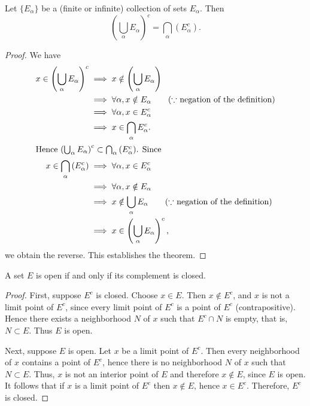  \begin{theorem}\label{thm:De_Morgan}
Let $\{E_{\alpha}\}$ be a (finite or infinite) collection of sets $E_{\alpha}$. 
Then
\begin{equation}
    \left(\bigcup_{\alpha}E_{\alpha}\right)^c = \bigcap_{\alpha} \left(E_{\alpha}^c\right).
\end{equation}
 \end{theorem}
 \begin{proof}
We have
\begin{align*}
x \in \left(\bigcup_{\alpha}E_{\alpha}\right)^c &\implies x \notin \left(\bigcup_{\alpha}E_{\alpha}\right) \\ 
&\implies \forall \alpha, x \notin E_{\alpha} \tag*{($\because$ negation of the definition)} \\
&\implies \forall \alpha, x \in E_{\alpha}^c \\
&\implies x\in \bigcap_{\alpha} E_{\alpha}^c. \\
\intertext{Hence $\left(\bigcup_{\alpha}E_{\alpha}\right)^c \subset \bigcap_{\alpha} \left(E_{\alpha}^c\right)$.
Since}
    x \in \bigcap_{\alpha} \left(E_{\alpha}^c\right) &\implies \forall \alpha, x \in E_{\alpha}^c \\
    &\implies \forall \alpha, x \notin E_{\alpha} \\
    &\implies x \notin \bigcup_{\alpha} E_{\alpha} \tag*{($\because$ negation of the definition)} \\
    &\implies x \in \left(\bigcup_{\alpha}E_{\alpha}\right)^c,
\end{align*}
we obtain the reverse. This establishes the theorem.
 \end{proof}
 \begin{theorem}\label{thm:open_close_equivalnce}
    A set $E$ is open if and only if its complement is closed.
 \end{theorem}
 \begin{proof}
First, suppose $E^c$ is closed. Choose $x \in E$. 
Then $x \notin E^c$, and $x$ is not a limit point of $E^c$, since every limit point of $E^c$ is a point of $E^c$ (contrapositive).
Hence there exists a neighborhood $N$ of $x$ such that $E^c \cap N$ is empty, that is, $N \subset E$.
Thus $E$ is open.

Next, suppose $E$ is open. 
Let $x$ be a limit point of $E^c$.
Then every neighborhood of $x$ contains a point of $E^c$, hence there is no neighborhood $N$ of $x$ such that $N \subset E$.
Thus, $x$ is not an interior point of $E$ and therefore $x \notin E$, since $E$ is open.
It follows that if $x$ is a limit point of $E^c$ then $x \notin E$, hence $x \in E^c$.
Therefore, $E^c$ is closed.
 \end{proof}

